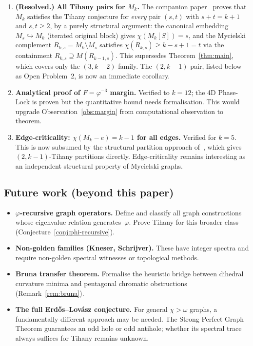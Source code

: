 \documentclass[11pt,a4paper]{amsart}
\theoremstyle{plain}
\theoremstyle{definition}
\theoremstyle{remark}
\newcommand{\vp}{\varphi}
\newcommand{\chr}{\chi}
\newcommand{\om}{\omega}
\begin{document}
\begin{enumerate}[(1)]
\item \textbf{(Resolved.)} \textbf{All Tihany pairs for $M_k$.}
  The companion paper~\cite{santos2026amplification} proves that
  $M_k$ satisfies the Tihany conjecture for \emph{every} pair $(s,t)$
  with $s + t = k + 1$ and $s, t \geq 2$, by a purely structural argument:
  the canonical embedding $M_s \hookrightarrow M_k$ (iterated original block)
  gives $\chr(M_k[S]) = s$, and the Mycielski complement
  $R_{k,s} = M_k \setminus M_s$ satisfies
  $\chr(R_{k,s}) \geq k - s + 1 = t$ via the containment
  $R_{k,s} \supseteq M(R_{k-1,s})$.  This supersedes
  Theorem~\ref{thm:main}, which covers only the $(3, k{-}2)$ family.
  The $(2, k{-}1)$ pair, listed below as Open Problem~2, is now
  an immediate corollary.

\item \textbf{Analytical proof of $F = \vp^{-3}$ margin.}
  Verified to $k = 12$; the 4D Phase-Lock is proven but the quantitative bound
  needs formalisation.  This would upgrade Observation~\ref{obs:margin} from
  computational observation to theorem.

\item \textbf{Edge-criticality: $\chr(M_k - e) = k - 1$ for all edges.}
  Verified for $k = 5$.  This is now subsumed by the structural
  partition approach of~\cite{santos2026amplification}, which gives
  $(2, k{-}1)$-Tihany partitions directly.  Edge-criticality remains
  interesting as an independent structural property of Mycielski graphs.
\end{enumerate}

\subsection{Future work (beyond this paper)}

\begin{itemize}
\item \textbf{$\vp$-recursive graph operators.}
  Define and classify all graph constructions whose eigenvalue relation
  generates~$\vp$.  Prove Tihany for this broader class
  (Conjecture~\ref{conj:phi-recursive}).

\item \textbf{Non-golden families (Kneser, Schrijver).}
  These have integer spectra and require non-golden spectral witnesses or
  topological methods.

\item \textbf{Bruna transfer theorem.}
  Formalise the heuristic bridge between dihedral curvature minima and
  pentagonal chromatic obstructions (Remark~\ref{rem:bruna}).

\item \textbf{The full Erd\H{o}s--Lov\'asz conjecture.}
  For general $\chr > \om$ graphs, a fundamentally different approach may be
  needed.  The Strong Perfect Graph Theorem guarantees an odd hole or odd
  antihole; whether its spectral trace always suffices for Tihany remains
  unknown.
\end{itemize}
\end{document}
